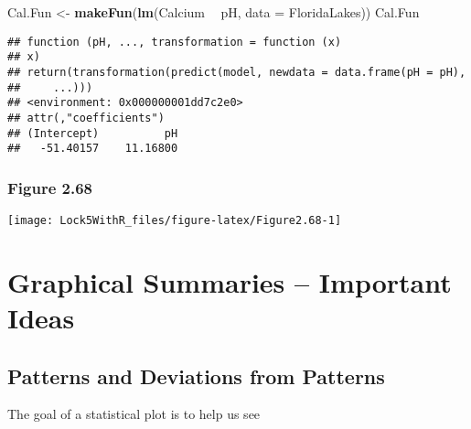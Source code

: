 \documentclass[]{book}
\newenvironment{Shaded}{\begin{snugshade}}{\end{snugshade}}
\newcommand{\DataTypeTok}[1]{\textcolor[rgb]{0.13,0.29,0.53}{#1}}
\newcommand{\KeywordTok}[1]{\textcolor[rgb]{0.13,0.29,0.53}{\textbf{#1}}}
\newcommand{\NormalTok}[1]{#1}
\newcommand{\OperatorTok}[1]{\textcolor[rgb]{0.81,0.36,0.00}{\textbf{#1}}}
\newcommand{\StringTok}[1]{\textcolor[rgb]{0.31,0.60,0.02}{#1}}
\begin{document}
\begin{Shaded}
\begin{Highlighting}[]
\NormalTok{Cal.Fun <-}\StringTok{ }\KeywordTok{makeFun}\NormalTok{(}\KeywordTok{lm}\NormalTok{(Calcium }\OperatorTok{~}\StringTok{ }\NormalTok{pH, }\DataTypeTok{data =}\NormalTok{ FloridaLakes))}
\NormalTok{Cal.Fun}
\end{Highlighting}
\end{Shaded}

\begin{verbatim}
## function (pH, ..., transformation = function (x) 
## x) 
## return(transformation(predict(model, newdata = data.frame(pH = pH), 
##     ...)))
## <environment: 0x000000001dd7c2e0>
## attr(,"coefficients")
## (Intercept)          pH 
##   -51.40157    11.16800
\end{verbatim}

\hypertarget{figure-2.68}{%
\subsubsection{Figure 2.68}\label{figure-2.68}}

\begin{Shaded}
\end{Shaded}

\texttt{[image: Lock5WithR\_files/figure-latex/Figure2.68-1]}

\hypertarget{graphical-summaries-important-ideas}{%
\section{Graphical Summaries -- Important Ideas}\label{graphical-summaries-important-ideas}}

\hypertarget{patterns-and-deviations-from-patterns}{%
\subsection{Patterns and Deviations from Patterns}\label{patterns-and-deviations-from-patterns}}

The goal of a statistical plot is to help us see
\end{document}
